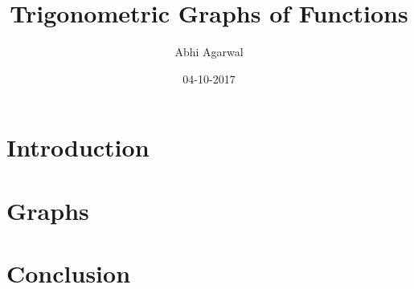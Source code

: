 \documentclass{article}
\title{Trigonometric Graphs of Functions}
\date{04-10-2017}
\author{Abhi Agarwal}
\begin{document}
  \maketitle
  \newpage

  \section{Introduction}
  \section{Graphs}
  \section{Conclusion}
\end{document}
